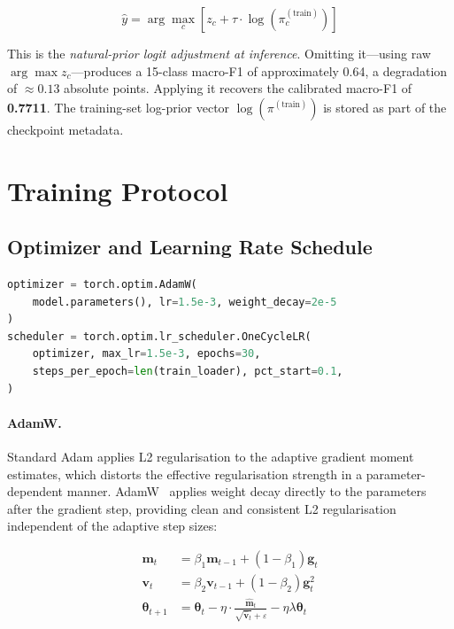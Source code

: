 \documentclass[12pt]{article}
\theoremstyle{plain}
\begin{document}
\begin{equation}
\hat{y} = \arg\max_c \left[ z_c + \tau \cdot \log(\pi_c^{(\text{train})}) \right]
\label{eq:inference}
\end{equation}

This is the \textit{natural-prior logit adjustment at inference}. Omitting it—using raw $\arg\max z_c$—produces a 15-class macro-F1 of approximately 0.64, a degradation of $\approx 0.13$ absolute points. Applying it recovers the calibrated macro-F1 of \textbf{0.7711}. The training-set log-prior vector $\log(\pi^{(\text{train})})$ is stored as part of the checkpoint metadata.

\newpage

\section{Training Protocol}
\label{sec:training}

\subsection{Optimizer and Learning Rate Schedule}

\begin{lstlisting}[language=Python, caption={Optimizer and OneCycleLR schedule.}]
optimizer = torch.optim.AdamW(
    model.parameters(), lr=1.5e-3, weight_decay=2e-5
)
scheduler = torch.optim.lr_scheduler.OneCycleLR(
    optimizer, max_lr=1.5e-3, epochs=30,
    steps_per_epoch=len(train_loader), pct_start=0.1,
)
\end{lstlisting}

\paragraph{AdamW.} Standard Adam applies L2 regularisation to the adaptive gradient moment estimates, which distorts the effective regularisation strength in a parameter-dependent manner. AdamW~\cite{Loshchilov2019} applies weight decay directly to the parameters after the gradient step, providing clean and consistent L2 regularisation independent of the adaptive step sizes:

\begin{align}
\mathbf{m}_t &= \beta_1 \mathbf{m}_{t-1} + (1-\beta_1)\mathbf{g}_t \\
\mathbf{v}_t &= \beta_2 \mathbf{v}_{t-1} + (1-\beta_2)\mathbf{g}_t^2 \\
\boldsymbol{\theta}_{t+1} &= \boldsymbol{\theta}_t - \eta \cdot \frac{\hat{\mathbf{m}}_t}{\sqrt{\hat{\mathbf{v}}_t}+\varepsilon} - \eta \lambda \boldsymbol{\theta}_t
\end{align}
\end{document}
